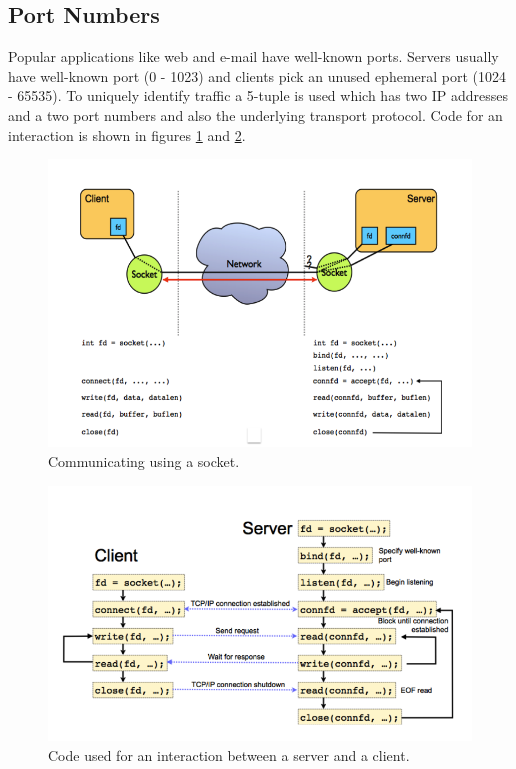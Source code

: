 \documentclass[twoside]{article}
\begin{document}
\subsection{Port Numbers}
Popular applications like web and e-mail have well-known ports. Servers usually
have well-known port (0 - 1023) and clients pick an unused ephemeral port
(1024 - 65535). To uniquely identify traffic a 5-tuple is used which has
two IP addresses and a two port numbers and also the underlying transport
protocol. Code for an interaction is shown in figures \ref{fig:sock1} and
\ref{fig:sock2}.
\begin{figure}
  \includegraphics[width=\linewidth]{sock1.png}
  \caption{Communicating using a socket.}
  \label{fig:sock1}
\end{figure}
\begin{figure}
  \includegraphics[width=\linewidth]{sock2.png}
  \caption{Code used for an interaction between a server and a client.}
  \label{fig:sock2}
\end{figure}
\end{document}
